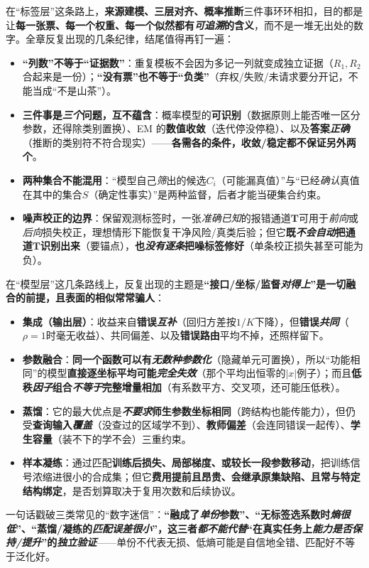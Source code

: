 在“标签层”这条路上，\textbf{来源建模、三层对齐、概率推断}三件事环环相扣，目的都是让\textbf{每一张票、每一个权重、每一个似然都有\emph{可追溯}的含义}，而不是一堆无出处的数字。全章反复出现的几条纪律，结尾值得再钉一遍：
\begin{itemize}\item \textbf{“列数”不等于“证据数”}：重复模板不会因为多记一列就变成独立证据（$R_1,R_2$合起来是一份）；\textbf{“没有票”也不等于“负类”}（弃权/失败/未请求要分开记，不能当成“不是山茶”）。\item \textbf{三件事是\emph{三个}问题，互不蕴含}：概率模型的\textbf{可识别}（数据原则上能否唯一区分参数，还得除类别置换）、EM 的\textbf{数值收敛}（迭代停没停稳）、以及\textbf{答案\emph{正确}}（推断的类别符不符合现实）——\textbf{各需各的条件，收敛/稳定都不保证另外两个}。\item \textbf{两种集合不能混用}：“模型自己\emph{筛}出的候选$C_i$（可能漏真值）”与“已经\emph{确认}真值在其中的集合$S$（确定性事实）”是两种监督，后者才能当硬集合约束。\item \textbf{噪声校正的边界}：保留观测标签时，一张\emph{准确已知}的报错通道$\bm T$可用于\emph{前向}或\emph{后向}损失校正，理想情形下能恢复干净风险/真类后验；但它\textbf{既\emph{不会自动}把通道$\bm T$识别出来}（要锚点），\textbf{也\emph{没有逐条}把噪标签修好}（单条校正损失甚至可能为负）。\end{itemize}

在“模型层”这几条路线上，反复出现的主题是\textbf{“接口/坐标/监督\emph{对得上}”是一切融合的前提，且\textbf{表面的相似常常骗人}}：
\begin{itemize}\item \textbf{集成（输出层）}：收益来自\textbf{错误\emph{互补}}（回归方差按$1/K$下降），但\textbf{错误\emph{共同}}（$\rho=1$时毫无收益）、共同偏差、以及\textbf{错误路由}平均不掉，还照样留下。\item \textbf{参数融合}：\textbf{同一个函数可以有\emph{无数种参数化}}（隐藏单元可置换），所以“功能相同”的模型\textbf{直接逐坐标平均可能\emph{完全失效}}（那个平均出恒零的$|x|$例子）；而且\textbf{低秩\emph{因子}组合\emph{不等于}完整增量相加}（有系数平方、交叉项，还可能压低秩）。\item \textbf{蒸馏}：它的最大优点是\textbf{\emph{不要求}师生参数坐标相同}（跨结构也能传能力），但仍受\textbf{查询输入\emph{覆盖}}（没查过的区域学不到）、\textbf{教师偏差}（会连同错误一起传）、\textbf{学生容量}（装不下的学不会）三重约束。\item \textbf{样本凝练}：通过匹配\textbf{训练后损失、局部梯度、或较长一段参数移动}，把训练信号浓缩进很小的合成集；但它\textbf{费用提前且昂贵、会继承原集缺陷、且常与特定结构绑定}，是否划算取决于复用次数和后续协议。\end{itemize}
一句话戳破三类常见的“数字迷信”：\textbf{“融成了\emph{单份}参数”、“无标签选系数时\emph{熵很低}”、“蒸馏/凝练的\emph{匹配误差很小}”，这三者\emph{都不能代替}“在真实任务上\emph{能力是否保持/提升}”的\emph{独立验证}}——单份不代表无损、低熵可能是自信地全错、匹配好不等于泛化好。

